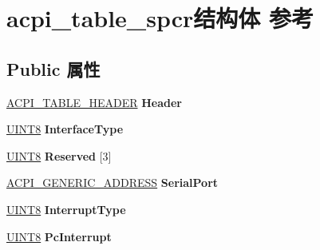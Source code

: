 \hypertarget{structacpi__table__spcr}{}\section{acpi\+\_\+table\+\_\+spcr结构体 参考}
\label{structacpi__table__spcr}
\subsection*{Public 属性}
\begin{DoxyCompactItemize}
\item 
\mbox{\label{structacpi__table__spcr_a05a4f3fc2efa395156fef1f8ccd05389}} 
\hyperlink{structacpi__table__header}{A\+C\+P\+I\+\_\+\+T\+A\+B\+L\+E\+\_\+\+H\+E\+A\+D\+ER} {\bfseries Header}
\item 
\mbox{\label{structacpi__table__spcr_aeec115b5ea7db0befeb86bcaf605286b}} 
\hyperlink{_processor_bind_8h_ab27e9918b538ce9d8ca692479b375b6a}{U\+I\+N\+T8} {\bfseries Interface\+Type}
\item 
\mbox{\label{structacpi__table__spcr_ad5391045ea3c482921102eb24ff6a70e}} 
\hyperlink{_processor_bind_8h_ab27e9918b538ce9d8ca692479b375b6a}{U\+I\+N\+T8} {\bfseries Reserved} \mbox{[}3\mbox{]}
\item 
\mbox{\label{structacpi__table__spcr_a6fc96d856b4aa18186cc70ec229f5623}} 
\hyperlink{structacpi__generic__address}{A\+C\+P\+I\+\_\+\+G\+E\+N\+E\+R\+I\+C\+\_\+\+A\+D\+D\+R\+E\+SS} {\bfseries Serial\+Port}
\item 
\mbox{\label{structacpi__table__spcr_a676938fc33894ce39ec5b91abe8d6ebf}} 
\hyperlink{_processor_bind_8h_ab27e9918b538ce9d8ca692479b375b6a}{U\+I\+N\+T8} {\bfseries Interrupt\+Type}
\item 
\mbox{\label{structacpi__table__spcr_a79ed0c888d25895e14f0575b8413977b}} 
\hyperlink{_processor_bind_8h_ab27e9918b538ce9d8ca692479b375b6a}{U\+I\+N\+T8} {\bfseries Pc\+Interrupt}
\item 
\mbox{\label{structacpi__table__spcr_af2498b04cb019c2490e5298ab1d6bbae}} 

\end{DoxyCompactItemize}
